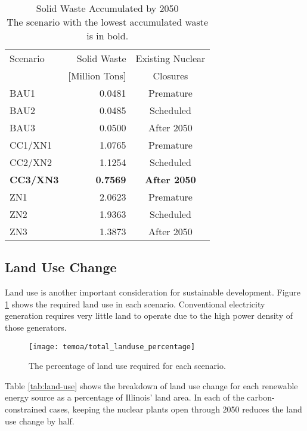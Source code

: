 \begin{table}[H]
  \centering
  \caption{Solid Waste Accumulated by 2050\\The scenario with the
  lowest accumulated waste is in bold.}
  \label{tab:total-waste}
  \begin{tabular}{lrc}
    \hline
    Scenario & Solid Waste & Existing Nuclear \\
    & [Million Tons]& Closures \\
    \hline
    BAU1 & 0.0481& Premature\\
    BAU2 & 0.0485& Scheduled\\
    BAU3 & 0.0500& After 2050\\
    CC1/XN1 & 1.0765 & Premature\\
    CC2/XN2 & 1.1254& Scheduled\\
    \textbf{CC3/XN3} & \textbf{0.7569}& \textbf{After 2050}\\
    ZN1 & 2.0623& Premature\\
    ZN2 & 1.9363& Scheduled\\
    ZN3 & 1.3873& After 2050\\
    \hline
  \end{tabular}
\end{table}

\subsection{Land Use Change}

Land use is another important consideration for sustainable development. Figure
\ref{fig:land-use-percentage} shows the required land use in each scenario.
Conventional electricity generation requires very little land to operate due
to the high power density of those generators.

\begin{figure}[H]
  \centering
  \texttt{[image: temoa/total\_landuse\_percentage]}
  \caption{The percentage of land use required for each scenario.}
  \label{fig:land-use-percentage}
\end{figure}

Table \ref{tab:land-use} shows the breakdown of land use change for each
renewable energy source as a percentage of Illinois' land area. In each of the
carbon-constrained cases, keeping the nuclear plants open through 2050 reduces
the land use change by half.

